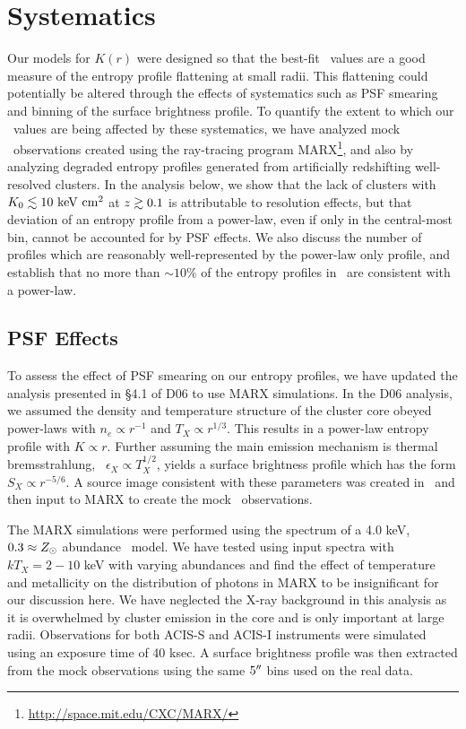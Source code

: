 \documentclass[12pt,preprint]{aastex}
\begin{document}
\section{Systematics}
\label{sec:sys}

Our models for $K(r)$ were designed so that the best-fit \kna\ values
are a good measure of the entropy profile flattening at small
radii. This flattening could potentially be altered through the
effects of systematics such as PSF smearing and binning of the surface
brightness profile. To quantify the extent to which our
\kna\ values are being affected by these systematics, we have analyzed
mock \chandra\ observations created using the ray-tracing program
MARX\footnote{\url{http://space.mit.edu/CXC/MARX/}}, and also by
analyzing degraded entropy profiles generated from artificially
redshifting well-resolved clusters. In the analysis below, we show
that the lack of clusters with $K_0 \lesssim 10 \mathrm{\mbox{\ensuremath{\mathrm{~keV}}} \mathrm{\mbox{\ensuremath{\mathrm{~cm}}}^2}}$ at $z \gtrsim 0.1$ is
attributable to resolution effects, but that deviation of an entropy
profile from a power-law, even if only in the central-most bin, cannot
be accounted for by PSF effects. We also discuss the number of
profiles which are reasonably well-represented by the power-law only
profile, and establish that no more than $\sim 10\%$ of the entropy
profiles in \accept\ are consistent with a power-law.

\subsection{PSF Effects}
\label{sec:psf}

To assess the effect of PSF smearing on our entropy profiles, we have
updated the analysis presented in \S4.1 of D06 to use MARX
simulations. In the D06 analysis, we assumed the density and
temperature structure of the cluster core obeyed power-laws with $n_e
\propto r^{-1}$ and $T_X \propto r^{1/3}$. This results in a power-law
entropy profile with $K \propto r$. Further assuming the main emission
mechanism is thermal bremsstrahlung, \ie\ $\epsilon_X \propto
T_X^{1/2}$, yields a surface brightness profile which has the form
$S_X \propto r^{-5/6}$. A source image consistent with these
parameters was created in \idl\ and then input to MARX to create the
mock \chandra\ observations.

The MARX simulations were performed using the spectrum of a 4.0 keV,
$0.3 \approx Z_{\odot}$ abundance \mekal\ model. We have tested using
input spectra with $kT_X = 2-10$ keV with varying abundances and find
the effect of temperature and metallicity on the distribution of
photons in MARX to be insignificant for our discussion here. We have
neglected the X-ray background in this analysis as it is overwhelmed
by cluster emission in the core and is only important at large
radii. Observations for both ACIS-S and ACIS-I instruments were
simulated using an exposure time of 40 ksec. A surface brightness
profile was then extracted from the mock observations using the same
$5\mathrm{^\prime}\hskip -0.1em\mathrm{^\prime}$ bins used on the real data.
\end{document}
